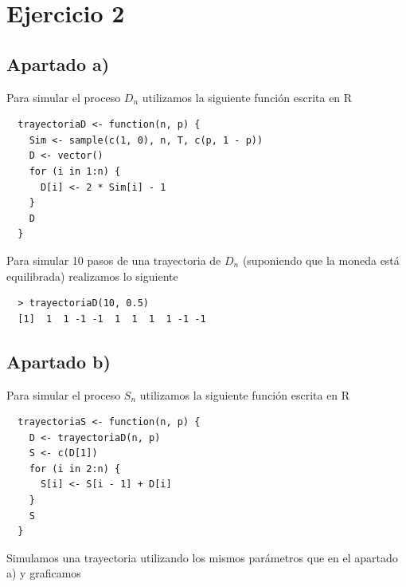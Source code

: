 \documentclass[11pt]{article}
\begin{document}

\section{Ejercicio 2}

\subsection*{Apartado a)}
Para simular el proceso $ D_n $ utilizamos la siguiente función escrita en R

\begin{verbatim}
  trayectoriaD <- function(n, p) {
    Sim <- sample(c(1, 0), n, T, c(p, 1 - p))
    D <- vector()
    for (i in 1:n) {
      D[i] <- 2 * Sim[i] - 1
    }
    D
  }
\end{verbatim}

Para simular 10 pasos de una trayectoria de $ D_n $ (suponiendo que la moneda
está equilibrada) realizamos lo siguiente
\begin{verbatim}
  > trayectoriaD(10, 0.5)
  [1]  1  1 -1 -1  1  1  1  1 -1 -1
\end{verbatim}


\subsection*{Apartado b)}
Para simular el proceso $ S_n $ utilizamos la siguiente función escrita en R

\begin{verbatim}
  trayectoriaS <- function(n, p) {
    D <- trayectoriaD(n, p)
    S <- c(D[1])
    for (i in 2:n) {
      S[i] <- S[i - 1] + D[i]
    }
    S
  }
\end{verbatim}

Simulamos una trayectoria utilizando los mismos parámetros que en el apartado
a) y graficamos
\end{document}
